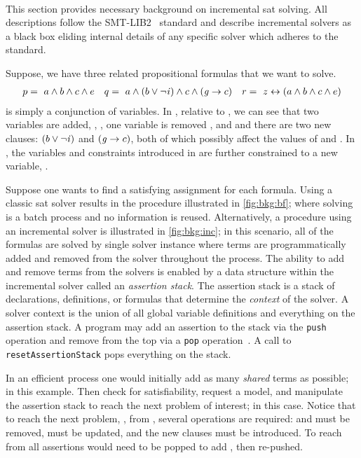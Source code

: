 ~\label{sec:background}

This section provides necessary background on incremental \ac{sat} solving. All
descriptions follow the SMT-LIB2~\cite{BarFT-SMTLIB} standard and describe
incremental solvers as a black box eliding internal details of any specific
solver which adheres to the standard.

%

%

Suppose, we have three related propositional formulas that we want to solve.
%
\begin{align*}
  p =\ a \wedge b \wedge c \wedge e && q=\ a \wedge (b \vee \neg \mathit{i}{}) \wedge c \wedge (\mathit{g}{} \rightarrow c) && r =~z \leftrightarrow (a \wedge b \wedge c \wedge e)
\end{align*}
%
\pV{} is simply a conjunction of variables. In \qV{}, relative to \pV{}, we can
see that two variables are added, \iV{}, \gV{}, one variable is removed \eV{},
and and there are two new clauses: $(b \vee \neg \mathit{i}{})$ and $(\mathit{g}{} \rightarrow
c)$, both of which possibly affect the values of \bV{} and \cV{}. In \rV{}, the
variables and constraints introduced in \pV{} are further constrained to a new
variable, \zV{}.

Suppose one wants to find a satisfying assignment for each formula. Using a
classic \ac{sat} solver results in the procedure illustrated in
\autoref{fig:bkg:bf}; where \sat{} solving is a batch process and no information
is reused. Alternatively, a procedure using an incremental \sat{} solver is
illustrated in \autoref{fig:bkg:inc}; in this scenario, all of the formulas are
solved by single solver instance where terms are programmatically added and
removed from the solver throughout the process. The ability to add and remove
terms from the solvers is enabled by a data structure within the incremental
\sat{} solver called an \textit{assertion stack}. The assertion stack is a stack
of declarations, definitions, or formulas that determine the \textit{context} of
the solver. A solver context is the union of all global variable definitions and
everything on the assertion stack. A program may add an assertion to the stack
via the \texttt{push} operation and remove from the top via a \texttt{pop}
operation~\cite{10.1007/978-3-319-09284-3_16}. A call to
\texttt{resetAssertionStack} pops everything on the stack.

In an efficient process one would initially add as many \emph{shared} terms as
possible; \pV{} in this example. Then check for satisfiability, request a model,
and manipulate the assertion stack to reach the next problem of interest; \qV{}
in this case. Notice that to reach the next problem, \qV{}, from \pV{}, several
operations are required: \eV{} and \cV{} must be removed, \bV{} must be updated,
and the new clauses must be introduced. To reach \rV{} from \qV{} all assertions
would need to be popped to add \zV{}, then re-pushed.

